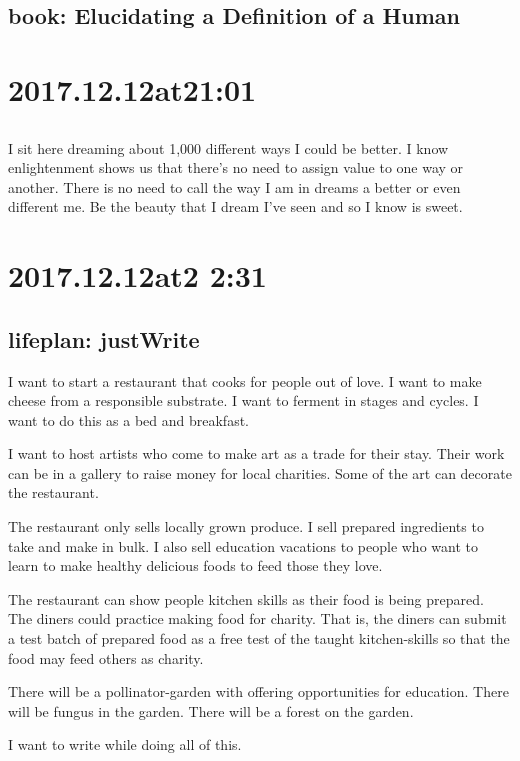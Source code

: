 \subsection*{ book: Elucidating a Definition of a Human }

\section*{ 2017.12.12at21:01 }
\subsection*{  }
I sit here dreaming about 1,000 different ways I could be better. I know enlightenment shows us that there's no need to assign value to one way or another. There is no need to call the way I am in dreams a better or even different me. Be the beauty that I dream I've seen and so I know is sweet.

\section*{ 2017.12.12at2 2:31 }
\subsection*{ lifeplan: justWrite }
I want to start a restaurant that cooks for people out of love. I want to make cheese from a responsible substrate. I want to ferment in stages and cycles. I want to do this as a bed and breakfast.

I want to host artists who come to make art as a trade for their stay. Their work can be in a gallery to raise money for local charities. Some of the art can decorate the restaurant.

The restaurant only sells locally grown produce. I sell prepared ingredients to take and make in bulk. I also sell education vacations to people who want to learn to make healthy delicious foods to feed those they love.

The restaurant can show people kitchen skills as their food is being prepared. The diners could practice making food for charity. That is, the diners can submit a test batch of prepared food as a free test of the taught kitchen-skills so that the food may feed others as charity.

There will be a pollinator-garden with offering opportunities for education. There will be fungus in the garden. There will be a forest on the garden.

I want to write while doing all of this.

